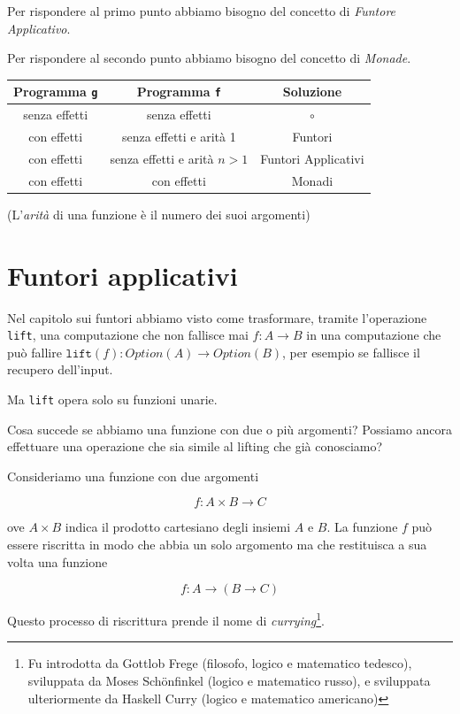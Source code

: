 \documentclass[12pt]{article}
\theoremstyle{definition}
\begin{document}
Per rispondere al primo punto abbiamo bisogno del concetto di \emph{Funtore Applicativo}.

Per rispondere al secondo punto abbiamo bisogno del concetto di \emph{Monade}.

\begin{center}
\bgroup
\def\arraystretch{1.5}
\begin{tabular}{ |c|c|c| }
\hline
Programma \texttt{g} & Programma \texttt{f} & Soluzione \\
\hline
senza effetti & senza effetti & $\circ$ \\
\hline
con effetti & senza effetti e arità 1 & Funtori \\
\hline
con effetti & senza effetti e arità $n > 1$ & Funtori Applicativi \\
\hline
con effetti & con effetti & Monadi \\
\hline
\end{tabular}
\egroup
\end{center}

(L'\emph{arità} di una funzione è il numero dei suoi argomenti)

\newpage

\section{Funtori applicativi}

Nel capitolo sui funtori abbiamo visto come trasformare, tramite l'operazione \texttt{lift},
una computazione che non fallisce mai $f: A \rightarrow B$ in una computazione che può fallire $\texttt{lift}(f): Option(A) \rightarrow Option(B)$,
per esempio se fallisce il recupero dell'input.

Ma \texttt{lift} opera solo su funzioni unarie.

Cosa succede se abbiamo una funzione con due o più argomenti?
Possiamo ancora effettuare una operazione che sia simile al lifting che già conosciamo?

Consideriamo una funzione con due argomenti

$$
f: A \times B \rightarrow C
$$

ove $A \times B$ indica il prodotto cartesiano degli insiemi $A$ e $B$.
La funzione $f$ può essere riscritta in modo che abbia un solo argomento ma che restituisca a sua volta una funzione

$$
f: A \rightarrow (B \rightarrow C)
$$

Questo processo di riscrittura prende il nome di \emph{currying}\footnote{Fu introdotta da Gottlob Frege (filosofo, logico e matematico tedesco), sviluppata da Moses Schönfinkel (logico e matematico russo), e sviluppata ulteriormente da Haskell Curry (logico e matematico americano)}.
\end{document}
